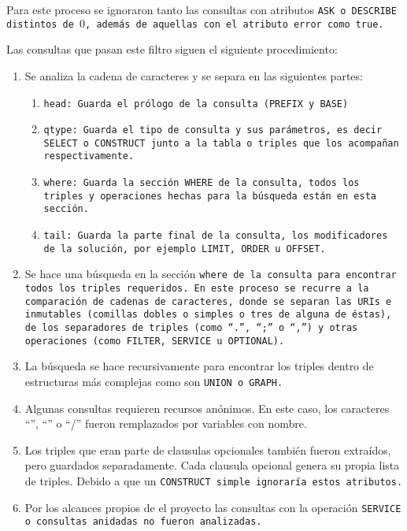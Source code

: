 Para este proceso se ignoraron tanto las consultas con atributos \tt{ASK} o
\tt{DESCRIBE} distintos de $0$, además de aquellas con el atributo \tt{error}
como \tt{true}.

Las consultas que pasan este filtro siguen el siguiente procedimiento:
\begin{enumerate}
  \item
    Se analiza la cadena de caracteres y se separa en las siguientes partes:
    \begin{enumerate}
      \item
        \tt{head}: Guarda el prólogo de la consulta (\tt{PREFIX} y \tt{BASE})
      \item
        \tt{qtype}: Guarda el tipo de consulta y sus parámetros, es decir
        \tt{SELECT} o \tt{CONSTRUCT} junto a la tabla o triples que los
        acompañan respectivamente.
      \item
        \tt{where}: Guarda la sección \tt{WHERE} de la consulta, todos los
        triples y operaciones hechas para la búsqueda están en esta sección.
      \item
        \tt{tail}: Guarda la parte final de la consulta, los modificadores de la
        solución, por ejemplo \tt{LIMIT}, \tt{ORDER} u \tt{OFFSET}.
    \end{enumerate}
  \item
    Se hace una búsqueda en la sección \tt{where} de la consulta para encontrar
    todos los triples requeridos. En este proceso se recurre a la comparación de
    cadenas de caracteres, donde se separan las URIs e inmutables (comillas
    dobles o simples o tres de alguna de éstas), de los separadores de triples
    (como ``\tt{.}'', ``\tt{;}'' o ``\tt{,}'') y otras operaciones (como
    \tt{FILTER},    \tt{SERVICE} u \tt{OPTIONAL}).
  \item
    La búsqueda se hace recursivamente para encontrar los triples dentro de
    estructuras más complejas como son \tt{UNION} o \tt{GRAPH}.
  \item
    Algunas consultas requieren recursos anónimos. En este caso, los
    caracteres ``\lbrack'', ``\rbrack'' o ``/'' fueron remplazados por variables
    con nombre.
  \item
    Los triples que eran parte de clausulas opcionales también fueron extraídos,
    pero guardados separadamente. Cada clausula opcional genera su propia lista
    de triples.
    Debido a que un \tt{CONSTRUCT} simple ignoraría estos atributos.
  \item
    Por los alcances propios de el proyecto las consultas con la operación
    \tt{SERVICE} o consultas anidadas no fueron analizadas.
\end{enumerate}

